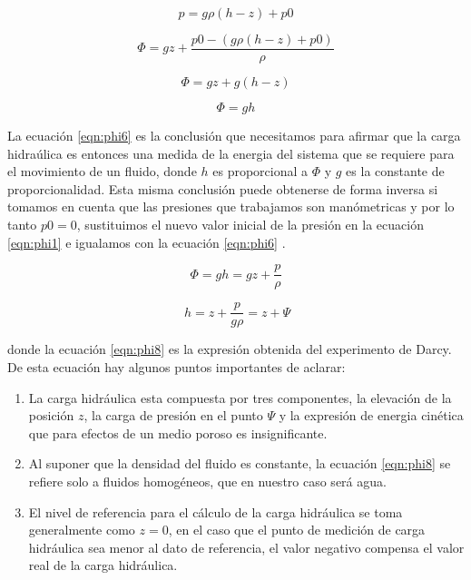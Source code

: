 \begin{equation}
\label{eqn:phi4}
p=g\rho(h-z)+p0
\end{equation}
 
\begin{equation}
\label{eqn:phi5}
\Phi= gz + \dfrac{p0-(g\rho(h-z)+p0)}{\rho} 
\end{equation} 

\begin{equation}
\label{eqn:phi6}
\Phi= gz + g(h-z) 
\end{equation}

\begin{equation}
\label{eqn:phino}
\Phi= gh 
\end{equation}

La ecuación \ref{eqn:phi6} es la conclusión que necesitamos para afirmar que la carga hidraúlica es entonces una medida de la energia del sistema que se requiere para el movimiento de un fluido, donde $h$ es proporcional a $\Phi$ y $g$ es la constante de proporcionalidad. Esta misma conclusión puede obtenerse de forma inversa si tomamos en cuenta que las presiones que trabajamos son manómetricas y por lo tanto $p0=0$, sustituimos el nuevo valor inicial de la presión en la ecuación \ref{eqn:phi1} e igualamos con la ecuación \ref{eqn:phi6} \cite{Freeze1979}\cite{Toth2009}.

\begin{equation}
\label{eqn:phi7}
\Phi= gh = gz + \dfrac{p}{\rho}
\end{equation}

\begin{equation}
\label{eqn:phi8}
\ h = z + \dfrac{p}{g\rho} =z + \Psi
\end{equation}

donde la ecuación \ref{eqn:phi8} es la expresión obtenida del experimento de Darcy. De esta ecuación hay algunos puntos importantes de aclarar:

\begin{enumerate}
 \item La carga hidráulica esta compuesta por tres componentes, la elevación de la posición $z$, la carga de presión en el punto $\Psi$ y la expresión de energia cinética que para efectos de un medio poroso es insignificante.
 \item Al suponer que la densidad del fluido es constante, la ecuación \ref{eqn:phi8} se refiere solo a fluidos homogéneos, que en nuestro caso será agua.
 \item El nivel de referencia para el cálculo de la carga hidráulica se toma generalmente como $z=0$, en el caso que el punto de medición de carga hidráulica sea menor al dato de referencia, el valor negativo compensa el valor real de la carga hidráulica.

 \end{enumerate} 

